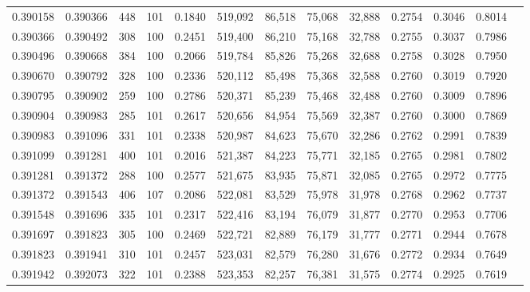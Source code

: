 \begin{tabular}{rrrrrrrrrrrrr}
0.390158 & 0.390366 &   448 & 101 &                                     0.1840 & 519,092 &  86,518 &  75,068 &  32,888 & 0.2754 & 0.3046 & 0.8014 \\
0.390366 & 0.390492 &   308 & 100 &                                     0.2451 & 519,400 &  86,210 &  75,168 &  32,788 & 0.2755 & 0.3037 & 0.7986 \\
0.390496 & 0.390668 &   384 & 100 &                                     0.2066 & 519,784 &  85,826 &  75,268 &  32,688 & 0.2758 & 0.3028 & 0.7950 \\
0.390670 & 0.390792 &   328 & 100 &                                     0.2336 & 520,112 &  85,498 &  75,368 &  32,588 & 0.2760 & 0.3019 & 0.7920 \\
0.390795 & 0.390902 &   259 & 100 &                                     0.2786 & 520,371 &  85,239 &  75,468 &  32,488 & 0.2760 & 0.3009 & 0.7896 \\
0.390904 & 0.390983 &   285 & 101 &                                     0.2617 & 520,656 &  84,954 &  75,569 &  32,387 & 0.2760 & 0.3000 & 0.7869 \\
0.390983 & 0.391096 &   331 & 101 &                                     0.2338 & 520,987 &  84,623 &  75,670 &  32,286 & 0.2762 & 0.2991 & 0.7839 \\
0.391099 & 0.391281 &   400 & 101 &                                     0.2016 & 521,387 &  84,223 &  75,771 &  32,185 & 0.2765 & 0.2981 & 0.7802 \\
0.391281 & 0.391372 &   288 & 100 &                                     0.2577 & 521,675 &  83,935 &  75,871 &  32,085 & 0.2765 & 0.2972 & 0.7775 \\
0.391372 & 0.391543 &   406 & 107 &                                     0.2086 & 522,081 &  83,529 &  75,978 &  31,978 & 0.2768 & 0.2962 & 0.7737 \\
0.391548 & 0.391696 &   335 & 101 &                                     0.2317 & 522,416 &  83,194 &  76,079 &  31,877 & 0.2770 & 0.2953 & 0.7706 \\
0.391697 & 0.391823 &   305 & 100 &                                     0.2469 & 522,721 &  82,889 &  76,179 &  31,777 & 0.2771 & 0.2944 & 0.7678 \\
0.391823 & 0.391941 &   310 & 101 &                                     0.2457 & 523,031 &  82,579 &  76,280 &  31,676 & 0.2772 & 0.2934 & 0.7649 \\
0.391942 & 0.392073 &   322 & 101 &                                     0.2388 & 523,353 &  82,257 &  76,381 &  31,575 & 0.2774 & 0.2925 & 0.7619 \\

\end{tabular}
